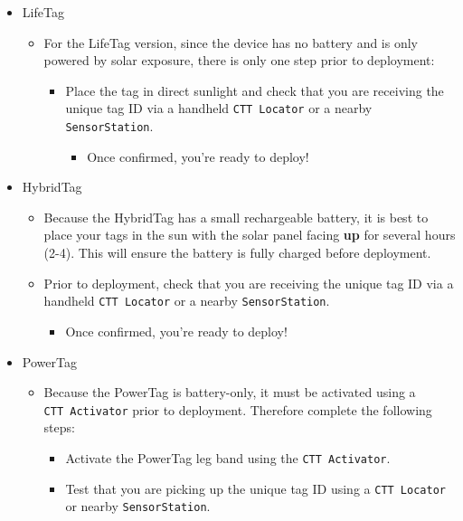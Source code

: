 \documentclass[
]{article}
\providecommand{\tightlist}{%
  \setlength{\itemsep}{0pt}\setlength{\parskip}{0pt}}
\begin{document}
\begin{itemize}
\tightlist
\item
  LifeTag

  \begin{itemize}
  \tightlist
  \item
    For the LifeTag version, since the device has no battery and is only
    powered by solar exposure, there is only one step prior to
    deployment:

    \begin{itemize}
    \tightlist
    \item
      Place the tag in direct sunlight and check that you are receiving
      the unique tag ID via a handheld \texttt{CTT\ Locator} or a nearby
      \texttt{SensorStation}.

      \begin{itemize}
      \tightlist
      \item
        Once confirmed, you're ready to deploy!
      \end{itemize}
    \end{itemize}
  \end{itemize}
\item
  HybridTag

  \begin{itemize}
  \tightlist
  \item
    Because the HybridTag has a small rechargeable battery, it is best
    to place your tags in the sun with the solar panel facing
    \textbf{up} for several hours (2-4). This will ensure the battery is
    fully charged before deployment.
  \item
    Prior to deployment, check that you are receiving the unique tag ID
    via a handheld \texttt{CTT\ Locator} or a nearby
    \texttt{SensorStation}.

    \begin{itemize}
    \tightlist
    \item
      Once confirmed, you're ready to deploy!
    \end{itemize}
  \end{itemize}
\item
  PowerTag

  \begin{itemize}
  \tightlist
  \item
    Because the PowerTag is battery-only, it must be activated using a
    \texttt{CTT\ Activator} prior to deployment. Therefore complete the
    following steps:

    \begin{itemize}
    \tightlist
    \item
      Activate the PowerTag leg band using the \texttt{CTT\ Activator}.
    \item
      Test that you are picking up the unique tag ID using a
      \texttt{CTT\ Locator} or nearby \texttt{SensorStation}.


\end{itemize}
\end{itemize}
\end{itemize}
\end{document}
